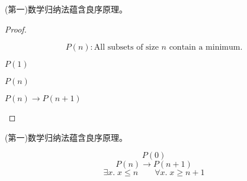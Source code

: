 \begin{frame}{}
  \begin{lemma}
    (第一)数学归纳法蕴含良序原理。
  \end{lemma}

  \pause
  \begin{proof}
    \begin{center}

      \vspace{-0.30cm}
      \[
        P(n): \text{All subsets of size $n$ contain a minimum.}
      \]

      \pause
      \begin{description}
        \item[Basis Step:] $P(1)$
        \item[\textcolor{cyan}{Inductive Hypothesis:}] $P(n)$
        \item[Inductive Step:] $P(n) \to P(n+1)$
      \end{description}

    \end{center}
  \end{proof}
\end{frame}

\begin{frame}{}
  \begin{lemma}
    (第一)数学归纳法蕴含良序原理。
  \end{lemma}

  \begin{center}

    \pause
    \vspace{0.20cm}
    \[
      P(0)
    \]
    \pause
    \[
      P(n) \to P(n + 1)
    \]
    \pause
    \[
      \exists x.\; x \le n \qquad \forall x.\; x \ge n + 1
    \]
  \end{center}
\end{frame}

